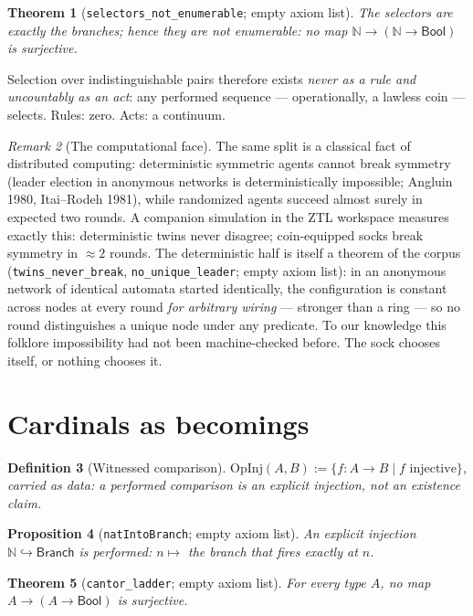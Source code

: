 \documentclass[11pt]{article}
\newtheorem{thm}{Theorem}[section]
\newtheorem{defn}[thm]{Definition}
\newtheorem{prop}[thm]{Proposition}
\theoremstyle{remark}
\newtheorem{rem}[thm]{Remark}
\newcommand{\N}{\mathbb{N}}
\newcommand{\Branch}{\textsf{Branch}}
\begin{document}
\begin{thm}[\texttt{selectors\_not\_enumerable}; empty axiom list]
The selectors are exactly the branches; hence they are not enumerable:
no map $\N \to (\N \to \mathsf{Bool})$ is surjective.
\end{thm}

Selection over indistinguishable pairs therefore exists \emph{never as a
rule and uncountably as an act}: any performed sequence --- operationally,
a lawless coin --- selects.  Rules: zero.  Acts: a continuum.

\begin{rem}[The computational face]
The same split is a classical fact of distributed computing:
deterministic symmetric agents cannot break symmetry (leader election in
anonymous networks is deterministically impossible; Angluin 1980,
Itai--Rodeh 1981), while randomized agents succeed almost surely in
expected two rounds.  A companion simulation in the ZTL workspace
measures exactly this: deterministic twins never disagree; coin-equipped
socks break symmetry in $\approx 2$ rounds.  The deterministic half is
itself a theorem of the corpus (\texttt{twins\_never\_break},
\texttt{no\_unique\_leader}; empty axiom list): in an anonymous network
of identical automata started identically, the configuration is constant
across nodes at every round \emph{for arbitrary wiring} --- stronger
than a ring --- so no round distinguishes a unique node under any
predicate.  To our knowledge this folklore impossibility had not been
machine-checked before.  The sock chooses itself, or nothing chooses
it.
\end{rem}

\section{Cardinals as becomings}
\label{sec:cardinals}

\begin{defn}[Witnessed comparison]
$\mathrm{OpInj}(A,B) := \{ f : A \to B \mid f \text{ injective} \}$,
carried as \emph{data}: a performed comparison is an explicit injection,
not an existence claim.
\end{defn}

\begin{prop}[\texttt{natIntoBranch}; empty axiom list]
An explicit injection $\N \hookrightarrow \Branch$ is performed:
$n \mapsto$ the branch that fires exactly at $n$.
\end{prop}

\begin{thm}[\texttt{cantor\_ladder}; empty axiom list]
For every type $A$, no map $A \to (A \to \mathsf{Bool})$ is surjective.
\end{thm}
\end{document}
